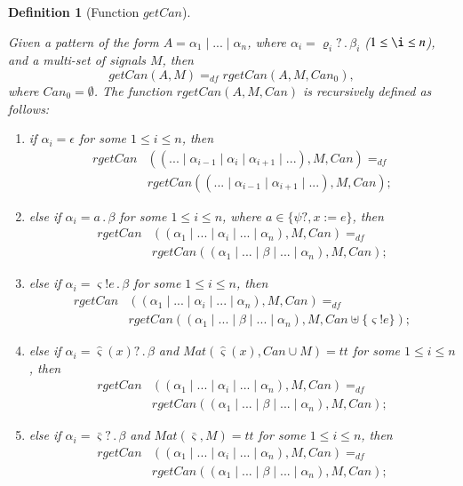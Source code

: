 \documentclass{fcs}
\newtheorem{mydef}{Definition}[section]
\newcommand{\sig}[0]{\varsigma}
\newcommand{\true}[0]{\mathit{tt}}
\newcommand{\Match}[0]{\mathit{Mat}}
\DeclareMathOperator{\sep}{|}
\DeclareMathOperator{\nex}{.}
\newcommand{\Can}[0]{\mathit{Can}}
\newcommand{\getCan}[0]{\mathit{getCan}}
\newcommand{\rgetCan}[0]{\mathit{rgetCan}}
\newcommand{\dddef}[0]{=_{df}}
\begin{document}
\begin{mydef}[Function $\getCan$]
\label{def:Function getCan}

    Given a pattern of the form $A = \alpha_1 \sep...\sep \alpha_n$, where $\alpha_i = \varrho_i?\nex \beta_i$ ($1\le \i\le n$), and a multi-set of signals $M$, then
    $$\getCan(A, M)\dddef \rgetCan(A, M, \Can_0),$$
    where $\Can_0=\emptyset$.
    The function $\rgetCan(A, M, \Can)$ is recursively defined as follows:
    \begin{enumerate}
    \item if $\alpha_i=\epsilon$ for some $1\le i\le n$, then
    $$
    \begin{aligned}
    \rgetCan&((...\sep \alpha_{i-1}\sep \alpha_i\sep \alpha_{i+1}\sep...), M, \Can)\dddef \\
    &\rgetCan((...\sep \alpha_{i-1}\sep \alpha_{i+1}\sep...), M, \Can);
    \end{aligned}
    $$

    \item else if $\alpha_i = a\nex \beta$ for some $1\le i\le n$, where $a\in \{\psi?, x:=e\}$, then
    $$\begin{aligned}
    \rgetCan&((\alpha_1\sep...\sep \alpha_{i}\sep...\sep\alpha_n), M, \Can)\dddef \\
    &\rgetCan((\alpha_1\sep...\sep \beta\sep...\sep\alpha_n), M, \Can);
    \end{aligned}
    $$

    \item else if $\alpha_i = \sig!e\nex \beta$ for some $1\le i\le n$, then
    $$\begin{aligned}
    \rgetCan&((\alpha_1\sep...\sep \alpha_{i}\sep...\sep\alpha_n), M, \Can)\dddef \\
    &\rgetCan((\alpha_1\sep...\sep \beta\sep...\sep\alpha_n), M, \Can\uplus\{\sig!e\});
    \end{aligned}
    $$

    \item else if $\alpha_i = \hat{\sig}(x)?\nex \beta$ and $\Match(\hat{\sig}(x),\Can\cup M)=\true$ for some $1\le i\le n$, then
    $$\begin{aligned}
    \rgetCan&((\alpha_1\sep...\sep \alpha_{i}\sep...\sep\alpha_n), M, \Can)\dddef \\
    &\rgetCan((\alpha_1\sep...\sep \beta\sep...\sep\alpha_n), M, \Can);
    \end{aligned}
    $$

    \item else if $\alpha_i = \bar{\sig}?\nex \beta$ and $\Match(\bar{\sig},M)=\true$ for some $1\le i\le n$, then
    $$\begin{aligned}
    \rgetCan&((\alpha_1\sep...\sep \alpha_{i}\sep...\sep\alpha_n), M, \Can)\dddef\\
    &\rgetCan((\alpha_1\sep...\sep \beta\sep...\sep\alpha_n), M, \Can);
    \end{aligned}
    $$


\end{enumerate}
\end{mydef}
\end{document}
